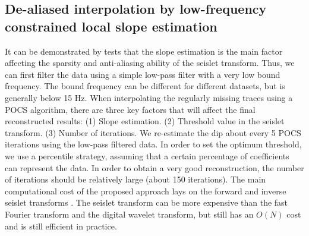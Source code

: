 \subsection{De-aliased interpolation by low-frequency constrained local slope estimation}
It can be demonstrated by tests that the slope estimation is the main factor affecting the sparsity and anti-aliasing ability of the seislet transform. Thus, we can first filter the data using a simple low-pass filter with a very low bound frequency. The bound frequency can be different for different datasets, but is generally below 15 Hz. When interpolating the regularly missing traces using a POCS algorithm, there are three key factors that will affect the final reconstructed results: (1) Slope estimation. (2) Threshold value in the seislet transform. (3) Number of iterations. We re-estimate the dip about every 5 POCS iterations using the low-pass filtered data. In order to set the optimum threshold, we use a percentile strategy, assuming that a certain percentage of coefficients can represent the data. In order to obtain a very good reconstruction, the number of iterations should be relatively large (about 150 iterations). The main computational cost of the proposed approach lays on the forward and inverse seislet transforms \cite{seislet,yangkang20142}. The seislet transform can be more expensive than the fast Fourier transform and the digital wavelet transform, but still has an $O(N)$ cost and is still efficient in practice.

